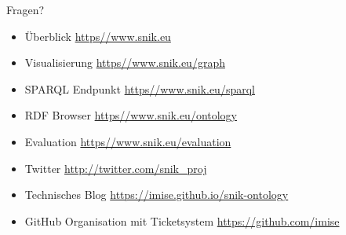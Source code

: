 \documentclass[aspectratio=1610,12pt]{beamer}
\begin{document}
\begin{frame}[fragile]{Fragen?}
\begin{itemize}
\vspace{0.5em}%
\item Überblick \url{https//www.snik.eu}
\item Visualisierung \url{https//www.snik.eu/graph}
\item SPARQL Endpunkt \url{https//www.snik.eu/sparql}
\item RDF Browser \url{https//www.snik.eu/ontology}
\item Evaluation \url{https//www.snik.eu/evaluation}
\item Twitter \url{http://twitter.com/snik\_proj}
\item Technisches Blog \url{https://imise.github.io/snik-ontology}
\item GitHub Organisation mit Ticketsystem \url{https://github.com/imise}
\end{itemize}
\end{frame}
\end{document}

